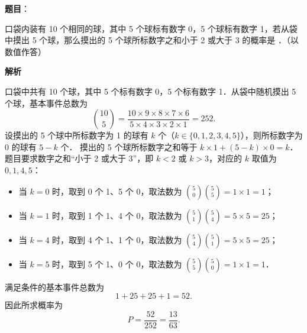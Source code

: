 \begin{answer}

\textbf{题目}：

口袋内装有 10 个相同的球，其中 5 个球标有数字 0，5 个球标有数字 1，若从袋中摸出 5 个球，那么摸出的 5 个球所标数字之和小于 2 或大于 3 的概率是 \underline{\hspace{3cm}}．（以数值作答）

\textbf{解析}

口袋中共有 10 个球，其中 5 个标有数字 0，5 个标有数字 1．从袋中随机摸出 5 个球，基本事件总数为
\nopagebreak[4]
\[
\binom{10}{5} = \frac{10 \times 9 \times 8 \times 7 \times 6}{5 \times 4 \times 3 \times 2 \times 1} = 252.
\]
设摸出的 5 个球中所标数字为 1 的球有 $k$ 个（$k \in \{0, 1, 2, 3, 4, 5\}$），则所标数字为 0 的球有 $5 - k$ 个．
摸出的 5 个球所标数字之和等于 $k \times 1 + (5 - k) \times 0 = k$．
题目要求数字之和“小于 2 或大于 3”，即 $k < 2$ 或 $k > 3$，对应的 $k$ 取值为 $0, 1, 4, 5$：
\begin{itemize}
\item 当 $k = 0$ 时，取到 0 个 1、5 个 0，取法数为 $\binom{5}{0}\binom{5}{5} = 1 \times 1 = 1$；
\item 当 $k = 1$ 时，取到 1 个 1、4 个 0，取法数为 $\binom{5}{1}\binom{5}{4} = 5 \times 5 = 25$；
\item 当 $k = 4$ 时，取到 4 个 1、1 个 0，取法数为 $\binom{5}{4}\binom{5}{1} = 5 \times 5 = 25$；
\item 当 $k = 5$ 时，取到 5 个 1、0 个 0，取法数为 $\binom{5}{5}\binom{5}{0} = 1 \times 1 = 1$．
\end{itemize}
满足条件的基本事件总数为
\nopagebreak[4]
\[
1 + 25 + 25 + 1 = 52.
\]
因此所求概率为
\nopagebreak[4]
\[
P = \frac{52}{252} = \frac{13}{63}.
\]


\end{answer}
